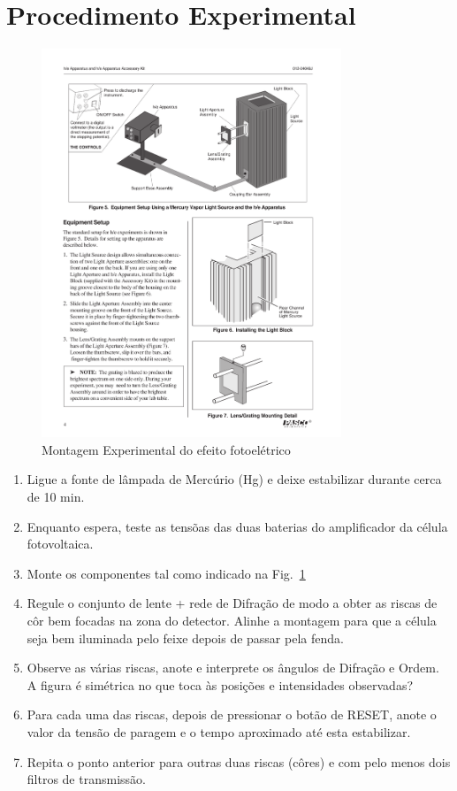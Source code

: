 \documentclass[a4paper,12pt]{article}  %
\begin{document}
\section{\sf Procedimento Experimental}

\begin{figure}[htb] 
	\centering 
	\includegraphics[width=0.8\textwidth]{planckPasco} 
	\caption{Montagem Experimental do efeito fotoelétrico} 
	\label{fig:plackPasco}
\end{figure}

\begin{enumerate}
\item Ligue a fonte de lâmpada de Mercúrio (Hg) e deixe estabilizar durante cerca de 10 min.
\item Enquanto espera, teste as tensõas das duas baterias do amplificador da célula fotovoltaica.
\item Monte os componentes tal como indicado na Fig.~\ref{fig:plackPasco}
\item Regule o conjunto de lente + rede de Difração de modo a obter as riscas de côr bem focadas na zona do detector. Alinhe a montagem para que a célula seja bem iluminada pelo feixe depois de passar pela fenda.
\item Observe as várias riscas, anote e interprete os ângulos de Difração e Ordem. A figura é simétrica  no que toca às posições e  intensidades observadas?
\item Para cada uma das riscas, depois de pressionar o botão de RESET, anote o valor da tensão de paragem e o tempo aproximado até esta estabilizar.
\item Repita o ponto anterior para outras duas riscas (côres) e com pelo menos dois filtros de transmissão.
\end{enumerate}
\end{document}
